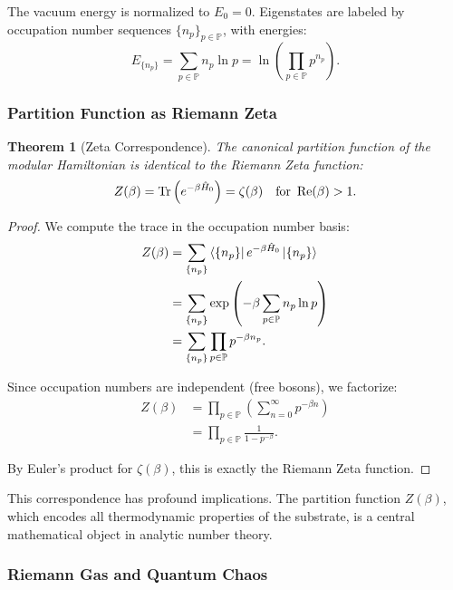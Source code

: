 \documentclass[11pt, a4paper]{article}
\theoremstyle{plain}
\newtheorem{theorem}{Theorem}[section]
\theoremstyle{definition}
\begin{document}
The vacuum energy is normalized to $E_0 = 0$. Eigenstates are labeled by occupation number sequences $\{n_p\}_{p \in \mathbb{P}}$, with energies:
\begin{equation}
E_{\{n_p\}} = \sum_{p \in \mathbb{P}} n_p \ln p = \ln\left(\prod_{p \in \mathbb{P}} p^{n_p}\right).
\end{equation}

\subsubsection{Partition Function as Riemann Zeta}

\begin{theorem}[Zeta Correspondence]
The canonical partition function of the modular Hamiltonian is identical to the Riemann Zeta function:
\begin{equation}
Z(\beta) = \Tr\left(e^{-\beta \hat{H}_0}\right) = \zeta(\beta) \quad \text{for } \Re(\beta) > 1.
\label{eq:zeta_correspondence}
\end{equation}
\end{theorem}

\begin{proof}
We compute the trace in the occupation number basis:
\begin{align*}
Z(\beta) &= \sum_{\{n_p\}} \bra{\{n_p\}} e^{-\beta \hat{H}_0} \ket{\{n_p\}} \\
&= \sum_{\{n_p\}} \exp\left(-\beta \sum_{p \in \mathbb{P}} n_p \ln p\right) \\
&= \sum_{\{n_p\}} \prod_{p \in \mathbb{P}} p^{-\beta n_p}.
\end{align*}

Since occupation numbers are independent (free bosons), we factorize:
\begin{align*}
Z(\beta) &= \prod_{p \in \mathbb{P}} \left( \sum_{n=0}^\infty p^{-\beta n} \right) \\
&= \prod_{p \in \mathbb{P}} \frac{1}{1 - p^{-\beta}}.
\end{align*}

By Euler's product for $\zeta(\beta)$, this is exactly the Riemann Zeta function.
\end{proof}

This correspondence has profound implications. The partition function $Z(\beta)$, which encodes all thermodynamic properties of the substrate, is a central mathematical object in analytic number theory.

\subsubsection{Riemann Gas and Quantum Chaos}
\end{document}
